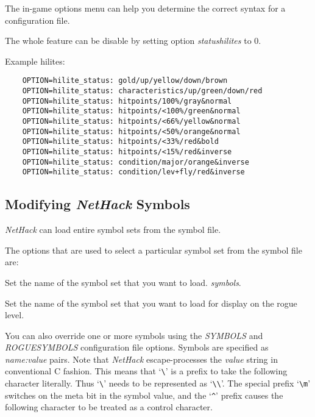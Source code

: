 The in-game options menu can help you determine the correct syntax for a
configuration file.

The whole feature can be disable by setting option {\it statushilites} to 0.

Example hilites:
\begin{verbatim}
    OPTION=hilite_status: gold/up/yellow/down/brown
    OPTION=hilite_status: characteristics/up/green/down/red
    OPTION=hilite_status: hitpoints/100%/gray&normal
    OPTION=hilite_status: hitpoints/<100%/green&normal
    OPTION=hilite_status: hitpoints/<66%/yellow&normal
    OPTION=hilite_status: hitpoints/<50%/orange&normal
    OPTION=hilite_status: hitpoints/<33%/red&bold
    OPTION=hilite_status: hitpoints/<15%/red&inverse
    OPTION=hilite_status: condition/major/orange&inverse
    OPTION=hilite_status: condition/lev+fly/red&inverse
\end{verbatim}

\subsection*{Modifying {\it NetHack\/} Symbols}

{\it NetHack\/} can load entire symbol sets from the symbol file.

The options that are used to select a particular symbol set from the
symbol file are:

\blist{}
\item[\ib{symset}]
Set the name of the symbol set that you want to load.
{\it symbols\/}.

\item[\ib{roguesymset}]
Set the name of the symbol set that you want to load for display
on the rogue level.
\elist

You can also override one or more symbols using the {\it SYMBOLS\/} and
{\it ROGUESYMBOLS\/} configuration file options.
Symbols are specified as {\it name:value\/} pairs.
Note that {\it NetHack\/} escape-processes
the {\it value\/} string in conventional C fashion.
This means that `\verb+\+' is a prefix to take the following character
literally.
Thus `\verb+\+' needs to be represented as `\verb+\\+'.
The special prefix
`\verb+\m+' switches on the meta bit in the symbol value, and the
`{\tt \^{}}' prefix causes the following character to be treated as a control
character.


